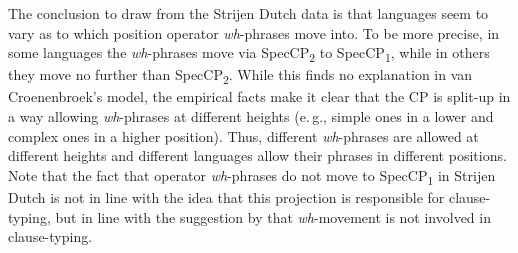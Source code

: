 \noindent The conclusion to draw from the Strijen Dutch data is that languages seem to vary as to which position operator \textit{wh}-phrases move into. To be more precise, in some languages the \textit{wh}-phrases move via SpecCP\textsubscript{2} to SpecCP\textsubscript{1}, while in others they move no further than SpecCP\textsubscript{2}. While this finds no explanation in van Croenenbroek's model, the empirical facts make it clear that the CP is split-up in a way allowing \textit{wh}-phrases at different heights (e.\,g., simple ones in a lower and complex ones in a higher position). Thus, different \textit{wh}-phrases are allowed at different heights and different languages allow their phrases in different positions. Note that the fact that operator \textit{wh}-phrases do not move to SpecCP\textsubscript{1} in Strijen Dutch is not in line with the idea that this projection is responsible for clause-typing, but in line with the suggestion by \citet{aboh2010sa} that \textit{wh}-movement is not involved in clause-typing. 



